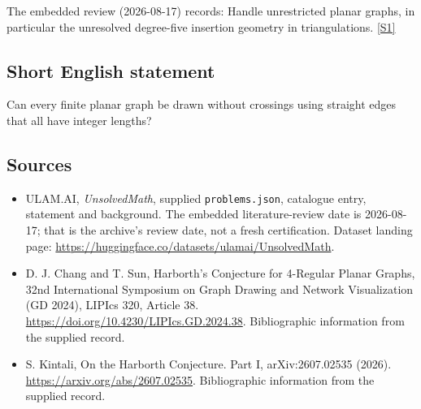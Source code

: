 \documentclass[11pt,a4paper]{article}
\newcommand{\sref}[2]{\hyperlink{source:#1:#2}{[S#2]}}
\begin{document}
The embedded review (2026-08-17) records: Handle unrestricted planar graphs, in particular the unresolved degree-five insertion geometry in triangulations. \sref{statement}{1}

\subsection{Short English statement}

Can every finite planar graph be drawn without crossings using straight edges that all have integer lengths?

\subsection{Sources}

{\small

\begin{itemize}

\item[\hypertarget{source:statement:1}{S1}] ULAM.AI, \emph{UnsolvedMath}, supplied \texttt{problems.json}, catalogue entry, statement and background. The embedded literature-review date is 2026-08-17; that is the archive’s review date, not a fresh certification. Dataset landing page: \url{https://huggingface.co/datasets/ulamai/UnsolvedMath}.

\item[\hypertarget{source:statement:2}{S2}] D. J. Chang and T. Sun, Harborth's Conjecture for 4-Regular Planar Graphs, 32nd International Symposium on Graph Drawing and Network Visualization (GD 2024), LIPIcs 320, Article 38. \url{https://doi.org/10.4230/LIPIcs.GD.2024.38}. Bibliographic information from the supplied record.

\item[\hypertarget{source:statement:3}{S3}] S. Kintali, On the Harborth Conjecture. Part I, arXiv:2607.02535 (2026). \url{https://arxiv.org/abs/2607.02535}. Bibliographic information from the supplied record.

\end{itemize}

}

\label{end:statement}
\end{document}
